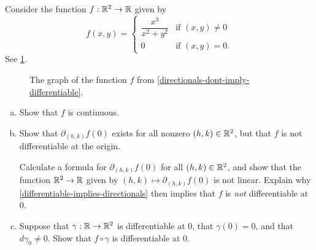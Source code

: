\begin{exercise} \label{directionals-dont-imply-differentiable}
	Consider the function $f : \mathbb{R}^2 \to \mathbb{R}$ given by
	\[ f(x,y) = \begin{cases} \dfrac{x^3}{x^2 +y^2} & \text{if } (x, y) \neq 0 \\ 0 & \text{if } (x,y) = 0. \end{cases} \]
	See \cref{directionals-dont-imply-differentiable-graph}.
	\begin{figure}[ht]
		\begin{center}
		\end{center}
		\caption{The graph of the function  $f$ from \cref{directionals-dont-imply-differentiable}.} \label{directionals-dont-imply-differentiable-graph}
	\end{figure} 
	\begin{enumerate}[(a)]
		\item Show that $f$ is continuous. 
		\item Show that $\partial_{(h,k)} f(0)$ exists for all nonzero $(h,k) \in \mathbb{R}^2$, but that $f$ is not differentiable at the origin.
		\begin{hint}
			Calculate a formula for $\partial_{(h,k)} f(0)$ for all $(h,k) \in \mathbb{R}^2$, and show that the function $\mathbb{R}^2 \to \mathbb{R}$ given by $(h,k) \mapsto \partial_{(h,k)} f(0)$ is not linear. Explain why \cref{differentiable-implies-directionals} then implies that $f$ is \emph{not} differentiable at 0.  
		\end{hint}
		\item Suppose that $\gamma : \mathbb{R} \to \mathbb{R}^2$ is differentiable at 0, that $\gamma(0) = 0$, and that $d\gamma_0 \neq 0$. Show that $f \circ \gamma$ is differentiable at 0. 
	\end{enumerate} 
\end{exercise}


